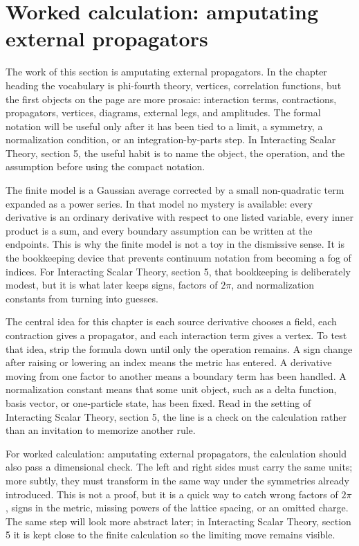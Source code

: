 \section{Worked calculation: amputating external propagators}

The work of this section is amputating external propagators.  In the chapter heading the vocabulary is phi-fourth theory, vertices, correlation functions, but the first objects on the page are more prosaic: interaction terms, contractions, propagators, vertices, diagrams, external legs, and amplitudes.  The formal notation will be useful only after it has been tied to a limit, a symmetry, a normalization condition, or an integration-by-parts step.  In Interacting Scalar Theory, section 5, the useful habit is to name the object, the operation, and the assumption before using the compact notation.

The finite model is a Gaussian average corrected by a small non-quadratic term expanded as a power series.  In that model no mystery is available: every derivative is an ordinary derivative with respect to one listed variable, every inner product is a sum, and every boundary assumption can be written at the endpoints.  This is why the finite model is not a toy in the dismissive sense.  It is the bookkeeping device that prevents continuum notation from becoming a fog of indices.  For Interacting Scalar Theory, section 5, that bookkeeping is deliberately modest, but it is what later keeps signs, factors of \(2\pi\), and normalization constants from turning into guesses.

The central idea for this chapter is each source derivative chooses a field, each contraction gives a propagator, and each interaction term gives a vertex.  To test that idea, strip the formula down until only the operation remains.  A sign change after raising or lowering an index means the metric has entered.  A derivative moving from one factor to another means a boundary term has been handled.  A normalization constant means that some unit object, such as a delta function, basis vector, or one-particle state, has been fixed.  Read in the setting of Interacting Scalar Theory, section 5, the line is a check on the calculation rather than an invitation to memorize another rule.

For worked calculation: amputating external propagators, the calculation should also pass a dimensional check.  The left and right sides must carry the same units; more subtly, they must transform in the same way under the symmetries already introduced.  This is not a proof, but it is a quick way to catch wrong factors of \(2\pi\), signs in the metric, missing powers of the lattice spacing, or an omitted charge.  The same step will look more abstract later; in Interacting Scalar Theory, section 5 it is kept close to the finite calculation so the limiting move remains visible.

